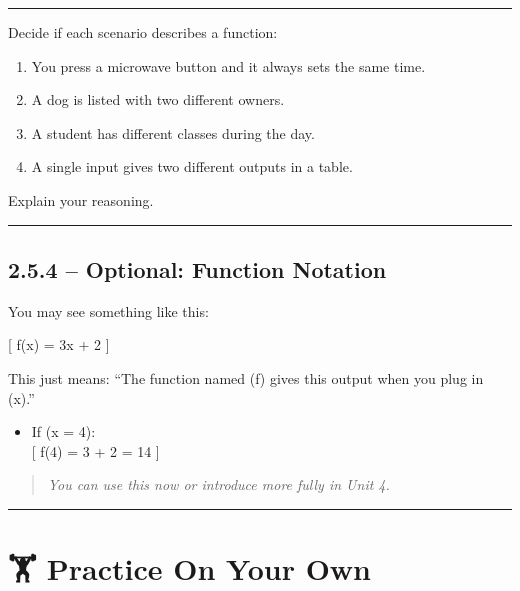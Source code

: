 \documentclass[
  letterpaper,
  DIV=11,
  numbers=noendperiod]{scrreprt}
\providecommand{\tightlist}{%
  \setlength{\itemsep}{0pt}\setlength{\parskip}{0pt}}
\begin{document}
\begin{center}\rule{0.5\linewidth}{0.5pt}\end{center}

Decide if each scenario describes a function:

\begin{enumerate}
\def\labelenumi{\arabic{enumi}.}
\tightlist
\item
  You press a microwave button and it always sets the same time.\\
\item
  A dog is listed with two different owners.\\
\item
  A student has different classes during the day.\\
\item
  A single input gives two different outputs in a table.
\end{enumerate}

Explain your reasoning.

\begin{center}\rule{0.5\linewidth}{0.5pt}\end{center}

\subsection*{2.5.4 -- Optional: Function
Notation}\label{optional-function-notation}

You may see something like this:

{[} f(x) = 3x + 2 {]}

This just means: ``The function named (f) gives this output when you
plug in (x).''

\begin{itemize}
\tightlist
\item
  If (x = 4):\\
  {[} f(4) = 3  + 2 = 14 {]}
\end{itemize}

\begin{quote}
\emph{You can use this now or introduce more fully in Unit 4.}
\end{quote}

\begin{center}\rule{0.5\linewidth}{0.5pt}\end{center}

\section*{🏋️ Practice On Your Own}\label{practice-on-your-own-11}
\end{document}
